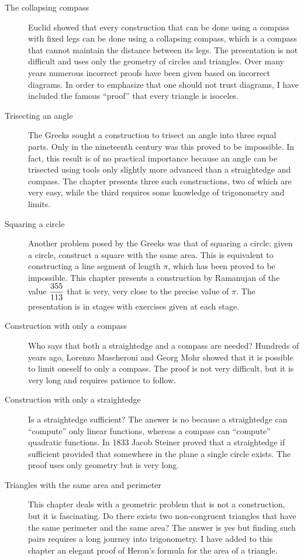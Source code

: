 \begin{description}
\item[The collapsing compass] Euclid showed that every construction that can be done using a compass with fixed legs can be done using a collapsing compass, which is a compass that cannot maintain the distance between its legs. The presentation is not difficult and uses only the geometry of circles and triangles. Over many years numerous incorrect proofs have been given based on incorrect diagrams. In order to emphasize that one should not trust diagrams, I have included the famous ``proof'' that every triangle is isoceles.

\item[Trisecting an angle] The Greeks sought a construction to trisect an angle into three equal parts. Only in the nineteenth century was this proved to be impossible. In fact, this result is of no practical importance because an angle can be trisected using tools only slightly more advanced than a straightedge and compass. The chapter presents three such constructions, two of which are very easy, while the third requires some knowledge of trigonometry and limits.

\item[Squaring a circle] Another problem posed by the Greeks was that of squaring a circle: given a circle, construct a square with the same area. This is equivalent to constructing a line segment of length $\pi$, which has been proved to be impossible. This chapter presents a construction by Ramanujan of the value $\displaystyle\frac{355}{113}$ that is very, very close to the precise value of $\pi$. The presentation is in stages with exercises given at each stage.

\item[Construction with only a compass] Who says that both a straightedge and a compass are needed? Hundreds of years ago, Lorenzo Mascheroni and Georg Mohr showed that it is possible to limit oneself to only a compass. The proof is not very difficult, but it is very long and requires patience to follow.

\item[Construction with only a straightedge] Is a straightedge sufficient? The answer is no because a straightedge can ``compute'' only linear functions, whereas a compass can ``compute'' quadratic functions. In 1833 Jacob Steiner proved that a straightedge if sufficient provided that somewhere in the plane a single circle exists. The proof uses only geometry but is very long.

\item[Triangles with the same area and perimeter] This chapter deals with a geometric problem that is not a construction, but it is fascinating. Do there exists two non-congruent triangles that have the same perimeter and the same area? The answer is yes but finding such pairs requires a long journey into trigonometry. I have added to this chapter an elegant proof of Heron's formula for the area of a triangle.

\end{description}
